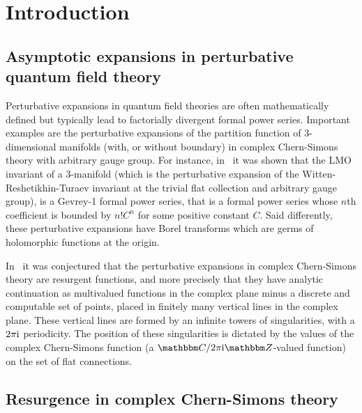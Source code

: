 \documentclass[12pt,reqno]{amsart}
\theoremstyle{definition}
\def\BZ{\mathbbm Z}
\def\BC{\mathbbm C}
\def\ri{\mathrm{i}}
\def\ri{{\rm i}}
\begin{document}
\maketitle

{\footnotesize
\tableofcontents
}


\section{Introduction}
\label{sec.intro}

\subsection{Asymptotic expansions in perturbative quantum
  field theory}
  
Perturbative expansions in quantum field theories are often
mathematically defined but typically lead to factorially divergent
formal power series. Important examples are the perturbative
expansions of the partition function of 3-dimensional manifolds (with,
or without boundary) in complex Chern-Simons theory with arbitrary
gauge group. For instance, in~\cite{GLM} it was shown that the LMO
invariant of a 3-manifold (which is the perturbative expansion of the
Witten-Reshetikhin-Turaev invariant at the trivial flat collection and
arbitrary gauge group), is a Gevrey-1 formal power series, that is a
formal power series whose $n$th coefficient is bounded by $n! C^n$ for
some positive constant $C$.  Said differently, these perturbative
expansions have Borel transforms which are germs of holomorphic
functions at the origin.

In~\cite{Ga:resurgence} it was conjectured that the perturbative
expansions in complex Chern-Simons theory are resurgent functions, and
more precisely that they have analytic continuation as multivalued
functions in the complex plane minus a discrete and computable set of
points, placed in finitely many vertical lines in the complex
plane. These vertical lines are formed by an infinite towers of
singularities, with a $2 \pi \ri$ periodicity. The position of these
singularities is dictated by the values of the complex Chern-Simons
function (a $\BC/2 \pi {\rm i} \BZ$-valued function) on the set of
flat connections.

\subsection{Resurgence in complex Chern-Simons theory}
\end{document}
